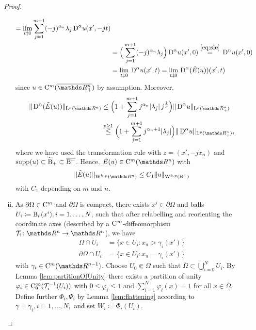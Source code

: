 \begin{proof}
\begin{enumerate}[i)]
\begin{align*}
        = \lim_{t \uparrow 0} \sum_{j = 1}^{m + 1} (-j)^{\alpha_n} \lambda_j \,{\operatorname{D}}^\alpha u(x', -jt) \\
        &= \Big(\sum_{j = 1}^{m + 1} (-j)^{\alpha_n} \lambda_j \Big) \,{\operatorname{D}}^\alpha u (x',0)
        \overset{\eqref{eq:sle}}{=} \,{\operatorname{D}}^\alpha u(x', 0) \\
        &= \lim_{t \downarrow 0} \,{\operatorname{D}}^\alpha u(x', t) 
        = \lim_{t \downarrow 0} \,{\operatorname{D}}^\alpha(\tilde E(u))(x', t)
      \end{align*}
      since $u \in \CC^m(\overline{\R^n_+})$ by assumption.
      Moreover,
      \begin{align*}
        \|\DD^\alpha(\tilde E(u)) \|_{\Ell^p(\R^n)}
       &\leq \Big( 1 + \sum_{j = 1}^{m + 1} j^{\alpha_n} |\lambda_j|\, j^{\frac{1}{p}} \Big) \|\DD^\alpha u\|_{\Ell^p(\R^n_+)}  \\
       &\overset{p \geq 1}{\leq} \Big( 1 + \sum_{j = 1}^{m + 1} j^{\alpha_n + 1} |\lambda_j| \Big) \|\DD^\alpha u\|_{\Ell^p(\R^n_+)},
      \end{align*}
      where we have used the transformation rule with $z = (x', -jx_n)$ and $\operatorname{supp}(u) \subset \widetilde {\mathrm{B}}_+ \subset \overline{\mathrm{B}^+}$.
      Hence, $\tilde E(u) \in\CC^m(\R^n)$ with
      \begin{equation}
        \label{eq:contExt}
        \|\tilde E (u)\|_{\WW^{k,p}(\R^n)} \leq C_1 \|u\|_{\WW^{k,p}(\BB^+)}
      \end{equation}
      with $C_1$ depending on $m$ and $n$.

    \item As $\partial \Omega \in \mathrm{C}^m$ and $\partial \Omega$ is compact, there exists $x^i \in \partial\Omega$ and balls $U_i \coloneqq \mathrm{B}_r(x^i), i = 1,\dots,N$, such that after relabelling and reorienting the coordinate axes (described by a $\mathrm{C}^\infty$\hyp{}diffeomorphism $\Tau_i \colon \R^n \to \R^n$), we have
      \begin{align*}
        \Omega \cap U_i &= \{ x \in U_i \colon x_n > \gamma_i(x') \} \\
        \partial\Omega \cap U_i &= \{x \in U_i \colon x_n = \gamma_i(x')\}
      \end{align*}
      with $\gamma_i \in \CC^m(\R^{n - 1})$.
      Choose $U_0 \Subset \Omega$ such that $\overline\Omega \subset \bigcup_{i = 0}^N U_i$.
      By Lemma \ref{lem:partitionOfUnity} there exists a partition of unity $\varphi_i \in \mathrm{C}_0^\infty(\mathcal{T}_i^{-1}(U_i))$ with $0 \leq \varphi_i \leq 1$ and $\sum_{i = 1}^N \varphi_i(x) = 1$ for all $x \in \overline\Omega$.
      Define further $\Phi_i,\Psi_i$ by Lemma \ref{lem:flattening} according to $\gamma = \gamma_i, i = 1,\dots,N,$ and set $W_i \coloneqq \Phi_i(U_i)$.


\end{enumerate}
\end{proof}
